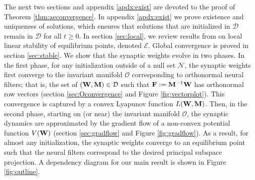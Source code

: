 \documentclass[11pt]{article}
\theoremstyle{definition}
\newcommand{\F}{{\bf F}}
\newcommand{\M}{{\bf M}}
\newcommand{\W}{{\bf W}}
\newcommand{\calD}{\mathcal{D}}
\newcommand{\calE}{\mathcal{E}}
\newcommand{\calN}{\mathcal{N}}
\newcommand{\calO}{\mathcal{O}}
\begin{document}
The next two sections and appendix \ref{apdx:exist} are devoted to the proof of Theorem \ref{thm:aeconvergence}. 
In appendix \ref{apdx:exist} we prove existence and uniqueness of solutions, which ensures that solutions that are initialized in $\calD$ remain in $\calD$ for all $t\ge0$.
In section \ref{sec:local}, we review results from \cite{pehlevan2018similarity} on local linear stability of equilibrium points, denoted $\calE$. Global convergence is proved in section \ref{sec:stable}. We show that the synaptic weights evolve in two phases. In the first phase, for any initialization outside of a null set $\calN$, the synaptic weights first converge to the invariant manifold $\calO$ corresponding to orthonormal neural filters; that is, the set of $(\W,\M)\in\calD$ such that $\F:=\M^{-1}\W$ has orthonormal row vectors (section \ref{sec:Oconvergence} and Figure \ref{fig:vectorplot}). This convergence is captured by a convex Lyapunov function $L(\W,\M)$. Then, in the second phase, starting on (or near) the invariant manifold $\calO$, the synaptic dynamics are approximated by the gradient flow of a non-convex potential function $V(\W)$ (section \ref{sec:gradflow} and Figure \ref{fig:gradflow}). As a result, for almost any initialization, the synaptic weights converge to an equilibrium point such that the neural filters correspond to the desired principal subspace projection. 
A dependency diagram for our main result is shown in Figure \ref{fig:outline}.
\end{document}
